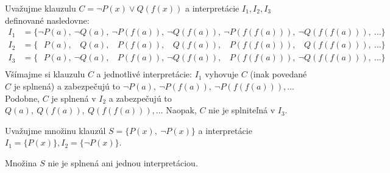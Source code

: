 \begin{priklad}
    Uvažujme klauzulu $C=\neg P(x) \lor Q(f(x))$ a
    interpretácie $I_1,I_2,I_3$ definované nasledovne:
    \newcommand{\phn}{\phantom{\neg}}
    \begin{align*}
        I_1 &= \{ \neg P(a),\ \neg Q(a),\ \neg P(f(a)),\ 
            \neg Q(f(a)),\ \neg P(f(f(a))),\ \neg Q(f(f(a))),\ \dots \} \\
        I_2 &= \{ \phn P(a),\ \phn Q(a),\ \phn P(f(a)),\ 
            \phn Q(f(a)),\ \phn P(f(f(a))),\ \phn Q(f(f(a))),\ \dots \} \\
        I_3 &= \{ \phn P(a),\ \neg Q(a),\ \phn P(f(a)),\
            \neg Q(f(a)),\ \phn P(f(f(a))),\ \neg Q(f(f(a))),\ \dots \} \\
    \end{align*}
    \def\phn{\undefined}
    Všímajme si klauzulu $C$ a jednotlivé interpretácie:
    $I_1$ vyhovuje $C$ (inak povedané $C$ je splnená) a zabezpečujú to
    $\neg P(a),\ \neg P(f(a)),\ \neg P(f(f(a))), \dots$
    Podobne, $C$ je splnená v $I_2$ a zabezpečujú to
    $Q(a),\ Q(f(a)),\ Q(f(f(a))), \dots$ Naopak, $C$ nie je
    splniteľná v $I_3$.
\end{priklad}

\begin{priklad}
    Uvažujme množinu klauzúl $S=\{P(x),\ \neg P(x)\}$ a
    interpretácie $I_1 = \{ P(x) \}, I_2 = \{ \neg P(x) \}$.

    Množina $S$ nie je splnená ani jednou interpretáciou.
\end{priklad}

